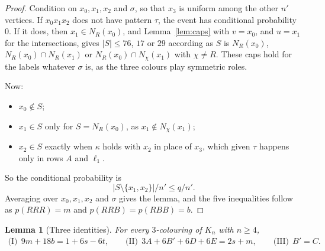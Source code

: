 \documentclass[11pt]{article}
\theoremstyle{spacedplain}
\newtheorem{lemma}[theorem]{Lemma}
\theoremstyle{spaceddef}
\theoremstyle{spacedremark}
\providecommand{\mkbreak}[1]{#1}%
\begin{document}
\begin{proof}
Condition on $x_0,x_1,x_2$ and $\sigma$, so that $x_3$ is uniform among the other $n'$ vertices.
If $x_0x_1x_2$ does not have pattern $\tau$, the event has conditional probability $0$.
If it does, then $x_1\in N_R(x_0)$, and Lemma~\ref{lem:caps} with $v=x_0$, and $u=x_1$ for the intersections, gives $|S|\le 76$, $17$ or $29$ according as $S$ is $N_R(x_0)$, $N_R(x_0)\cap N_R(x_1)$ or $N_R(x_0)\cap N_\chi(x_1)$ with $\chi\ne R$.
These caps hold for the labels whatever $\sigma$ is, as the three colours play symmetric roles.

Now:
\begin{itemize}
\item $x_0\notin S$;
\item $x_1\in S$ only for $S=N_R(x_0)$, as $x_1\notin N_\chi(x_1)$;
\item $x_2\in S$ exactly when $\kappa$ holds with $x_2$ in place of $x_3$, which given $\tau$ happens only in rows $A$ and $\ell_1$.
\end{itemize}
So the conditional probability is
\[
|S\setminus\{x_1,x_2\}|/n'\le q/n'.
\]
Averaging over $x_0,x_1,x_2$ and $\sigma$ gives the lemma, and the five inequalities follow as $p(RRR)=m$ and $p(RRB)=p(RBB)=b$.
\end{proof}

\begin{lemma}[Three identities]\label{lem:444id}
For every $3$-colouring of $K_n$ with $n\ge 4$,
\[
\begin{gathered}
\text{(I)}\ \ 9m+18b=1+6s-6t,\mkbreak{\qquad} \text{(II)}\ \ 3A+6B'+6D+6E=2s+m,\qquad \text{(III)}\ \ B'=C.
\end{gathered}
\]
\end{lemma}
\end{document}
